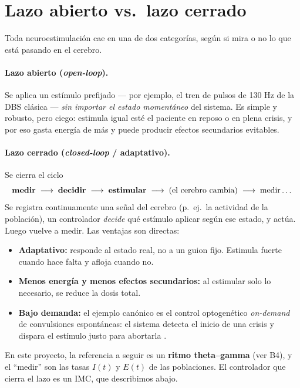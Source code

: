 \documentclass[11pt,a4paper]{article}
\begin{document}
\section{Lazo abierto vs.\ lazo cerrado}

Toda neuroestimulación cae en una de dos categorías, según si mira o no lo que está pasando en el cerebro.

\paragraph{Lazo abierto (\emph{open-loop}).} Se aplica un estímulo prefijado --- por ejemplo, el tren de pulsos de 130 Hz de la DBS clásica --- \emph{sin importar el estado momentáneo} del sistema. Es simple y robusto, pero ciego: estimula igual esté el paciente en reposo o en plena crisis, y por eso gasta energía de más y puede producir efectos secundarios evitables.

\paragraph{Lazo cerrado (\emph{closed-loop} / adaptativo).} Se cierra el ciclo
$$\text{\textbf{medir}} \;\longrightarrow\; \text{\textbf{decidir}} \;\longrightarrow\; \text{\textbf{estimular}} \;\longrightarrow\; (\text{el cerebro cambia})\;\longrightarrow\; \text{medir}\dots$$
Se registra continuamente una señal del cerebro (p.\ ej.\ la actividad de la población), un controlador \emph{decide} qué estímulo aplicar según ese estado, y actúa. Luego vuelve a medir. Las ventajas son directas:
\begin{itemize}[leftmargin=1.4em]
  \item \textbf{Adaptativo:} responde al estado real, no a un guion fijo. Estimula fuerte cuando hace falta y afloja cuando no.
  \item \textbf{Menos energía y menos efectos secundarios:} al estimular solo lo necesario, se reduce la dosis total.
  \item \textbf{Bajo demanda:} el ejemplo canónico es el control optogenético \emph{on-demand} de convulsiones espontáneas: el sistema detecta el inicio de una crisis y dispara el estímulo justo para abortarla \cite{krookmagnuson2013}.
\end{itemize}

En este proyecto, la referencia a seguir es un \textbf{ritmo theta--gamma} (ver B4), y el ``medir'' son las tasas $I(t)$ y $E(t)$ de las poblaciones. El controlador que cierra el lazo es un IMC, que describimos abajo.
\end{document}
